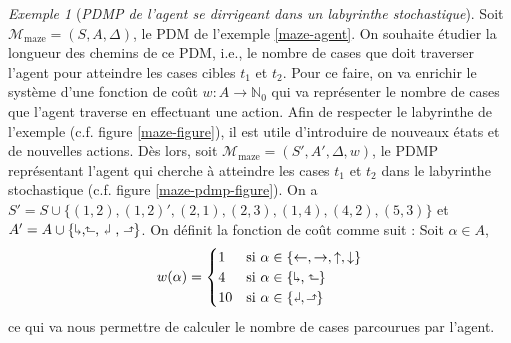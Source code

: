 \documentclass[12pt,a4paper]{report}
\theoremstyle{definition}%
\theoremstyle{remark}
\newtheorem{example}{Exemple}[chapter]
\begin{document}
\begin{example}[\textit{PDMP de l'agent se dirrigeant dans un labyrinthe
stochastique}]\label{maze-pdmp}
	Soit $\mathcal{M}_{\text{maze}} = (S, A, \Delta)$, le PDM de l'exemple
	\ref{maze-agent}. On souhaite étudier la longueur des chemins de ce PDM,
	i.e., le nombre de cases que doit traverser l'agent pour atteindre les cases
	cibles $t_1$ et $t_2$. Pour ce faire, on va enrichir le système d'une
	fonction de coût $w : A \rightarrow \mathbb{N}_0$ qui va représenter le
	nombre de cases que l'agent traverse en effectuant une action. Afin
	de respecter le labyrinthe de l'exemple (c.f. figure \ref{maze-figure}),
	il est utile d'introduire de nouveaux états et de nouvelles actions.
	Dès lors, soit $\mathcal{M}_{\text{maze}} = (S', A', \Delta, w)$, le PDMP
	représentant l'agent qui cherche à atteindre les cases $t_1$ et $t_2$ dans
	le labyrinthe stochastique (c.f. figure \ref{maze-pdmp-figure}).
	On a $S' = S \cup \{(1, 2), (1, 2)', (2, 1), (2, 3), (1, 4), (4, 2), (5, 3) \}$ et
	$A' = A \cup \{\text{\rotatebox[origin=c]{180}{$\Lsh$},\rotatebox[origin=c]{90}{$\Rsh$},
	\rotatebox[origin=c]{180}{$\Rsh$} , \rotatebox[origin=c]{270}{$\Lsh$}}\}$.
On définit la fonction de coût comme suit : Soit $\alpha \in A$,
\[ w(\alpha) =
	\begin{cases}
		1 & \text{si } \alpha \in \{\leftarrow, \rightarrow, \uparrow, \downarrow\} \\
		4 & \text{si } \alpha \in \{
		\text{\rotatebox[origin=c]{180}{$\Lsh$},
		\rotatebox[origin=c]{90}{$\Rsh$}}\} \\
		10 & \text{si } \alpha \in \{ \rotatebox[origin=c]{180}{$\Rsh$} , \rotatebox[origin=c]{270}{$\Lsh$}\}
	\end{cases}
\]
ce qui va nous permettre de calculer le nombre de cases parcourues par l'agent.
	\begin{figure}[H]
		\centering
		\captionsetup{justification=centering}

\end{figure}
\end{example}
\end{document}
